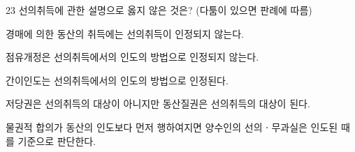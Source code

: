 \begin{question}{23}
선의취득에 관한 설명으로 옳지 않은 것은? (다툼이 있으면 판례에 따름)
\begin{choices}
  \item 경매에 의한 동산의 취득에는 선의취득이 인정되지 않는다.
  \item 점유개정은 선의취득에서의 인도의 방법으로 인정되지 않는다.
  \item 간이인도는 선의취득에서의 인도의 방법으로 인정된다.
  \item 저당권은 선의취득의 대상이 아니지만 동산질권은 선의취득의 대상이 된다.
  \item 물권적 합의가 동산의 인도보다 먼저 행하여지면 양수인의 선의ㆍ무과실은 인도된 때를 기준으로 판단한다.
\end{choices}
\end{question}
